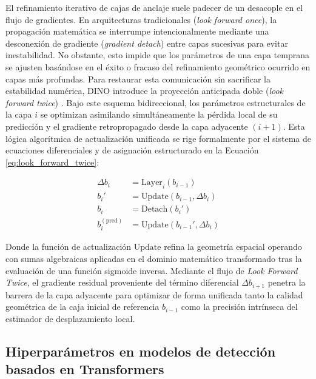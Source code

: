 El refinamiento iterativo de cajas de anclaje suele padecer de un desacople en el flujo de gradientes. En arquitecturas tradicionales (\textit{look forward once}), la propagación matemática se interrumpe intencionalmente mediante una desconexión de gradiente (\textit{gradient detach}) entre capas sucesivas para evitar inestabilidad. No obstante, esto impide que los parámetros de una capa temprana se ajusten basándose en el éxito o fracaso del refinamiento geométrico ocurrido en capas más profundas. Para restaurar esta comunicación sin sacrificar la estabilidad numérica, DINO introduce la proyección anticipada doble (\textit{look forward twice}) \cite{zhang2022dino}. Bajo este esquema bidireccional, los parámetros estructurales de la capa $i$ se optimizan asimilando simultáneamente la pérdida local de su predicción y el gradiente retropropagado desde la capa adyacente $(i+1)$. Esta lógica algorítmica de actualización unificada se rige formalmente por el sistema de ecuaciones diferenciales y de asignación estructurado en la Ecuación \ref{eq:look_forward_twice}:

\begin{equation}
    \begin{aligned}
        \Delta b_i &= \text{Layer}_i(b_{i-1}) \\
        b_i' &= \text{Update}(b_{i-1}, \Delta b_i) \\
        b_i &= \text{Detach}(b_i') \\
        b_i^{(\text{pred})} &= \text{Update}(b_{i-1}', \Delta b_i)
    \end{aligned}
    \label{eq:look_forward_twice}
\end{equation}

Donde la función de actualización $\text{Update}$ refina la geometría espacial operando con sumas algebraicas aplicadas en el dominio matemático transformado tras la evaluación de una función sigmoide inversa. Mediante el flujo de \textit{Look Forward Twice}, el gradiente residual proveniente del término diferencial $\Delta b_{i+1}$ penetra la barrera de la capa adyacente para optimizar de forma unificada tanto la calidad geométrica de la caja inicial de referencia $b_{i-1}$ como la precisión intrínseca del estimador de desplazamiento local.\\

\subsection{Hiperparámetros en modelos de detección basados en Transformers}

